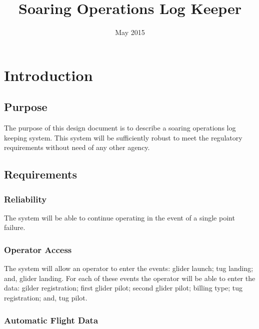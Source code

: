 \documentclass[a4paper]{report}
\title{Soaring Operations Log Keeper}
\numberwithin{equation}{chapter}
\begin{document}
\maketitle
\date{May 2015}

\clearpage\setcounter{page}{1}
\thispagestyle{Contents}

\tableofcontents

\clearpage\setcounter{page}{1}
\thispagestyle{Contents}

\listoffigures


\clearpage\setcounter{page}{1}
\chapter[Introduction]{Introduction}

\section[Purpose]{Purpose}

The purpose of this design document is to describe a soaring operations log keeping system. This system will be sufficiently robust to meet the regulatory requirements without need of any other agency.

\section[Requirements]{Requirements}

\subsection[Reliability]{Reliability}

The system will be able to continue operating in the event of a single point failure.

\subsection[Operator Access]{Operator Access}

The system will allow an operator to enter the events: glider launch; tug landing; and, glider landing. For each of these events the operator will be able to enter the data: gilder registration; first glider pilot; second glider pilot; billing type; tug registration; and, tug pilot.

\subsection[Automatic Flight Data]{Automatic Flight Data}
\end{document}
